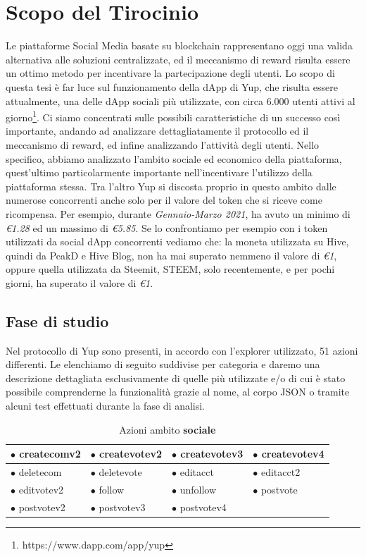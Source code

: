\section{Scopo del Tirocinio}
Le piattaforme Social Media basate su blockchain rappresentano oggi una valida alternativa alle soluzioni centralizzate, ed il meccanismo di reward risulta essere un ottimo metodo per incentivare la partecipazione degli utenti.
Lo scopo di questa tesi è far luce sul funzionamento della dApp di Yup, che risulta essere attualmente, una delle dApp sociali più utilizzate, con circa 6.000 utenti attivi al giorno\footnote{https://www.dapp.com/app/yup}. Ci siamo concentrati sulle possibili caratteristiche di un successo così importante, andando ad analizzare dettagliatamente il protocollo ed il meccanismo di reward, ed infine analizzando l'attività degli utenti. Nello specifico, abbiamo analizzato l'ambito sociale ed economico della piattaforma, quest'ultimo particolarmente importante nell'incentivare l'utilizzo della piattaforma stessa. Tra l'altro Yup si discosta proprio in questo ambito dalle numerose concorrenti anche solo per il valore del token che si riceve come ricompensa. Per esempio, durante \textit{Gennaio-Marzo 2021}, ha avuto un minimo di \textit{\euro1.28} ed un massimo di \textit{\euro5.85}. Se lo confrontiamo per esempio con i token utilizzati da social dApp concorrenti vediamo che: la moneta utilizzata su Hive, quindi da PeakD e Hive Blog, non ha mai superato nemmeno il valore di \textit{\euro1}, oppure quella utilizzata da Steemit, STEEM, solo recentemente, e per pochi giorni, ha superato il valore di \textit{\euro1}.


\subsection{Fase di studio}
\label{fasestudio_marker}
Nel protocollo di Yup sono presenti, in accordo con l'explorer utilizzato, 51 azioni differenti. Le elenchiamo di seguito suddivise per categoria e daremo una descrizione dettagliata esclusivamente di quelle più utilizzate e/o di cui è stato possibile comprenderne la funzionalità grazie al nome, al corpo JSON o tramite alcuni test effettuati durante la fase di analisi.

\begin{table}[t]
    \centering
    \caption{Azioni ambito \textbf{sociale}}
    \begin{tabular}{|l|l|l|l|}
    \hline
    $\bullet$ createcomv2 & $\bullet$ createvotev2 & $\bullet$ createvotev3 & $\bullet$ createvotev4 \\
    \hline
    $\bullet$ deletecom & $\bullet$ deletevote & $\bullet$ editacct & $\bullet$ editacct2 \\
    \hline
    $\bullet$ editvotev2 & $\bullet$ follow & $\bullet$ unfollow & $\bullet$ postvote \\
    \hline
    $\bullet$ postvotev2 & $\bullet$ postvotev3 & $\bullet$ postvotev4 \\
    \cline{1-3}
    \end{tabular}
    \label{tab: social_actions}
\end{table}

